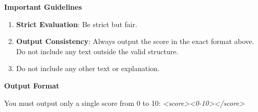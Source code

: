 \begin{tcolorbox}
\textbf{Important Guidelines}
\begin{enumerate}
  \item \textbf{Strict Evaluation}: Be strict but fair.
  \item \textbf{Output Consistency}: Always output the score in the exact format above. Do not include any text outside the valid structure.
  \item Do not include any other text or explanation.
\end{enumerate}

\textbf{Output Format}

You must output only a single score from 0 to 10:
\textcolor{gray!60!black}{\textit{<score>}}\textit{<0-10>}\textcolor{gray!60!black}{\textit{</score>}}
\end{tcolorbox}



